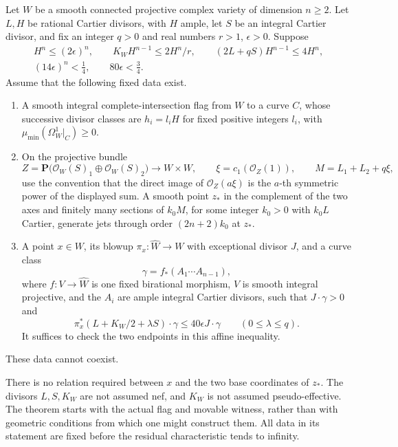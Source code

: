 \begin{theorem}
\label{common:finite-data-frobenius}
Let $W$ be a smooth connected projective complex variety of
dimension $n\ge2$. Let $L,H$ be rational Cartier divisors, with
$H$ ample, let $S$ be an integral Cartier divisor, and fix an
integer $q>0$ and real numbers $r>1$, $\epsilon>0$. Suppose
\begin{equation}\label{common:intersection-bounds}
 \begin{gathered}
 H^n\le(2\epsilon)^n,\qquad
 K_WH^{n-1}\le2H^n/r,\qquad
 (2L+qS)H^{n-1}\le4H^n,\\
 (14\epsilon)^n<\tfrac14,\qquad 80\epsilon<\tfrac34.
 \end{gathered}
\end{equation}
Assume that the following fixed data exist.
\begin{enumerate}[label=\textup{(\roman*)}]
\item A smooth integral complete-intersection flag from $W$ to
a curve $C$, whose successive divisor classes are $h_i=l_iH$
for fixed positive integers $l_i$, with
$\mu_{\min}(\Omega_W^1|_C)\ge0$.
\item On the projective bundle
\[
 Z=\mathbf P\bigl(\mathcal O_W(S)_1\oplus
                         \mathcal O_W(S)_2\bigr)\longrightarrow W\times W,
 \qquad \xi=c_1(\mathcal O_Z(1)),\qquad M=L_1+L_2+q\xi,
\]
use the convention that the direct image of $\mathcal O_Z(a\xi)$
is the $a$-th symmetric power of the displayed sum. A smooth
point $z_*$ in the complement of the two axes and finitely many
sections of $k_0M$, for some integer $k_0>0$ with $k_0L$ Cartier,
generate jets through order $(2n+2)k_0$ at $z_*$.
\item A point $x\in W$, its blowup
$\pi_x:\widehat W\to W$ with exceptional divisor $J$, and a
curve class
\[
 \gamma=f_*(A_1\cdots A_{n-1}),
\]
where $f:V\to\widehat W$ is one fixed birational morphism,
$V$ is smooth integral projective, and the $A_i$ are ample
integral Cartier divisors, such that $J\cdot\gamma>0$ and
\begin{equation}\label{common:movable-input}
 \pi_x^*(L+K_W/2+\lambda S)\cdot\gamma
 \le40\epsilon J\cdot\gamma\qquad(0\le\lambda\le q).
\end{equation}
It suffices to check the two endpoints in this affine inequality.
\end{enumerate}
These data cannot coexist.
\end{theorem}

There is no relation required between $x$ and the two base
coordinates of $z_*$. The divisors $L,S,K_W$ are not assumed
nef, and $K_W$ is not assumed pseudo-effective. The theorem
starts with the actual flag and movable witness, rather than
with geometric conditions from which one might construct them.
All data in its statement are fixed before the residual
characteristic tends to infinity.

